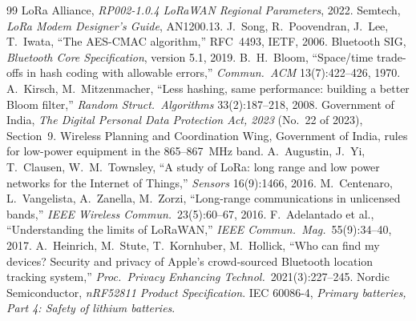 \documentclass[11pt,a4paper]{article}
\begin{document}
\begin{thebibliography}{99}\footnotesize
{} LoRa Alliance, \emph{RP002-1.0.4 LoRaWAN Regional Parameters}, 2022.
 Semtech, \emph{LoRa Modem Designer's Guide}, AN1200.13.
 J.~Song, R.~Poovendran, J.~Lee, T.~Iwata, ``The AES-CMAC algorithm,'' RFC~4493, IETF, 2006.
 Bluetooth SIG, \emph{Bluetooth Core Specification}, version 5.1, 2019.
 B.~H.~Bloom, ``Space/time trade-offs in hash coding with allowable errors,'' \emph{Commun.\ ACM}
13(7):422--426, 1970.
 A.~Kirsch, M.~Mitzenmacher, ``Less hashing, same performance: building a better Bloom filter,''
\emph{Random Struct.\ Algorithms} 33(2):187--218, 2008.
 Government of India, \emph{The Digital Personal Data Protection Act, 2023} (No.~22 of 2023), Section~9.
 Wireless Planning and Coordination Wing, Government of India, rules for low-power equipment in the
865--867~MHz band.
 A.~Augustin, J.~Yi, T.~Clausen, W.~M.~Townsley, ``A study of LoRa: long range and low power networks
for the Internet of Things,'' \emph{Sensors} 16(9):1466, 2016.
 M.~Centenaro, L.~Vangelista, A.~Zanella, M.~Zorzi, ``Long-range communications in unlicensed bands,''
\emph{IEEE Wireless Commun.}\ 23(5):60--67, 2016.
 F.~Adelantado et al., ``Understanding the limits of LoRaWAN,'' \emph{IEEE Commun.\ Mag.}\
55(9):34--40, 2017.
 A.~Heinrich, M.~Stute, T.~Kornhuber, M.~Hollick, ``Who can find my devices? Security and privacy of
Apple's crowd-sourced Bluetooth location tracking system,'' \emph{Proc.\ Privacy Enhancing Technol.}\ 2021(3):227--245.
\bibitem{nordic} Nordic Semiconductor, \emph{nRF52811 Product Specification}.
\bibitem{iec} IEC 60086-4, \emph{Primary batteries, Part 4: Safety of lithium batteries}.
\end{thebibliography}
\nocite{centenaro,nordic}
\end{document}
